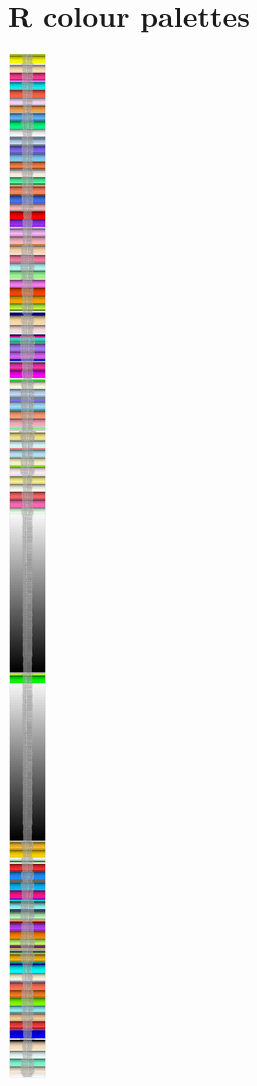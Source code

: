 \documentclass[
]{book}
\begin{document}
\hypertarget{appendix-appendix}{%
\appendix}


\hypertarget{colours}{%
\chapter{R colour palettes}\label{colours}}

\includegraphics{_main_files/figure-latex/unnamed-chunk-331-1.pdf}
\end{document}
